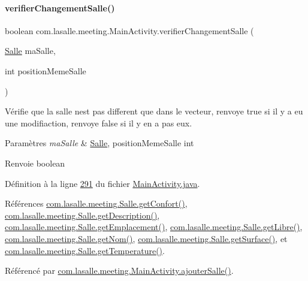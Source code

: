 \paragraph{\texorpdfstring{verifier\+Changement\+Salle()}{verifierChangementSalle()}}
{\footnotesize\ttfamily boolean com.\+lasalle.\+meeting.\+Main\+Activity.\+verifier\+Changement\+Salle (\begin{DoxyParamCaption}\item[{\hyperlink{classcom_1_1lasalle_1_1meeting_1_1_salle}{Salle}}]{ma\+Salle,  }\item[{int}]{position\+Meme\+Salle }\end{DoxyParamCaption})}



Vérifie que la salle n\textquotesingle{}est pas different que dans le vecteur, r\textquotesingle{}envoye true si il y a eu une modifiaction, r\textquotesingle{}envoye false si il y en a pas eux. 


\begin{DoxyParams}{Paramètres}
{\em ma\+Salle} & \hyperlink{classcom_1_1lasalle_1_1meeting_1_1_salle}{Salle}, position\+Meme\+Salle int \\
\hline
\end{DoxyParams}
\begin{DoxyReturn}{Renvoie}
boolean 
\end{DoxyReturn}


Définition à la ligne \hyperlink{_main_activity_8java_source_l00291}{291} du fichier \hyperlink{_main_activity_8java_source}{Main\+Activity.\+java}.



Références \hyperlink{_salle_8java_source_l00224}{com.\+lasalle.\+meeting.\+Salle.\+get\+Confort()}, \hyperlink{_salle_8java_source_l00276}{com.\+lasalle.\+meeting.\+Salle.\+get\+Description()}, \hyperlink{_salle_8java_source_l00156}{com.\+lasalle.\+meeting.\+Salle.\+get\+Emplacement()}, \hyperlink{_salle_8java_source_l00174}{com.\+lasalle.\+meeting.\+Salle.\+get\+Libre()}, \hyperlink{_salle_8java_source_l00165}{com.\+lasalle.\+meeting.\+Salle.\+get\+Nom()}, \hyperlink{_salle_8java_source_l00215}{com.\+lasalle.\+meeting.\+Salle.\+get\+Surface()}, et \hyperlink{_salle_8java_source_l00267}{com.\+lasalle.\+meeting.\+Salle.\+get\+Temperature()}.



Référencé par \hyperlink{_main_activity_8java_source_l00239}{com.\+lasalle.\+meeting.\+Main\+Activity.\+ajouter\+Salle()}.


